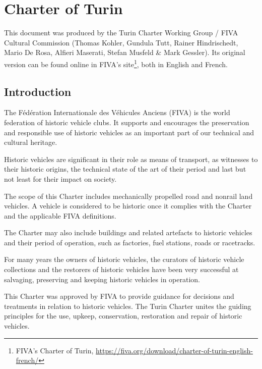 \documentclass[12pt]{article}
\begin{document}

\newpage
\setlength{\parindent}{0.25in}

\section{Charter of Turin}
\label{sec:charter_of_turin}

This document was produced by the Turin Charter Working Group / FIVA Cultural Commission (Thomas Kohler, Gundula Tutt, Rainer Hindrischedt, Mario De Rosa, Alfieri Maserati, Stefan Musfeld \& Mark Gessler). Its original version can be found online in FIVA's site\footnote{FIVA's Charter of Turin, \url{https://fiva.org/download/charter-of-turin-english-french/}}, both in English and French.


\subsection{Introduction}

The Fédération Internationale des Véhicules Anciens (FIVA) is the world federation of historic vehicle clubs. It supports and encourages the preservation and responsible use of historic vehicles as an important part of our technical and cultural heritage.

Historic vehicles are significant in their role as means of transport, as witnesses to their historic origins, the technical state of the art of their period and last but not least for their impact on society.

The scope of this Charter includes mechanically propelled road and nonrail land vehicles. A vehicle is considered to be historic once it complies with the Charter and the applicable FIVA definitions.

The Charter may also include buildings and related artefacts to historic vehicles and their period of operation, such as factories, fuel stations, roads or racetracks.

For many years the owners of historic vehicles, the curators of historic vehicle collections and the restorers of historic vehicles have been very successful at salvaging, preserving and keeping historic vehicles in operation.

This Charter was approved by FIVA to provide guidance for decisions and treatments in relation to historic vehicles. The Turin Charter unites the guiding principles for the use, upkeep, conservation, restoration and repair of historic vehicles.
\end{document}
